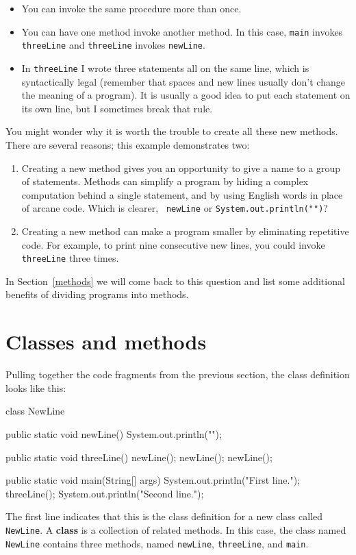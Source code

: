 \begin{itemize}

\item You can invoke the same procedure more than once.

\item You can have one method invoke another method.  In this
case, {\tt main} invokes {\tt threeLine} and {\tt threeLine}
invokes {\tt newLine}.

\item In {\tt threeLine} I wrote three statements all on the same
  line, which is syntactically legal (remember that spaces and new
  lines usually don't change the meaning of a program).  It is usually
  a good idea to put each statement on its own line, but I sometimes
  break that rule.

\end{itemize}

You might wonder why it is worth the trouble to
create all these new methods.  There are several
reasons; this example demonstrates two:

\begin{enumerate}

\item Creating a new method gives you an opportunity to
give a name to a group of statements.  Methods can simplify a program
by hiding a complex computation behind a single statement, and by using
English words in place of arcane code.  Which is clearer, {\tt
newLine} or {\tt System.out.println("")}?

\item Creating a new method can make a program smaller by eliminating
repetitive code.  For example, to print nine consecutive
new lines, you could invoke {\tt threeLine} three times.

\end{enumerate}

In Section~\ref{methods} we will come back to this question and list
some additional benefits of dividing programs into methods.


\section{Classes and methods}

Pulling together the code fragments from the previous
section, the class definition looks like this:

\begin{code}
class NewLine {

  public static void newLine() {
    System.out.println("");
  }

  public static void threeLine() {
    newLine();  newLine();  newLine();
  }

  public static void main(String[] args) {
    System.out.println("First line.");
    threeLine();
    System.out.println("Second line.");
  }
}
\end{code}
%
The first line indicates that this is the class definition for a new
class called {\tt NewLine}.  A {\bf class} is a collection of related
methods.  In this case, the class named {\tt NewLine} contains three
methods, named {\tt newLine}, {\tt threeLine}, and {\tt main}.

